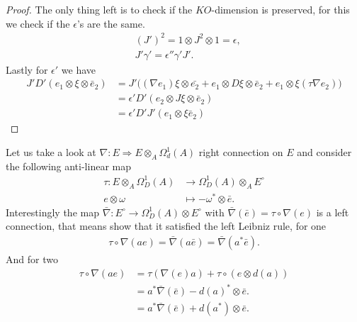 \begin{proof}
    The only thing left is to check if the $KO$-dimension is preserved,
    for this we check if the $\epsilon$'s are the same.
    \begin{align}
        &(J')^2 = 1 \otimes J^2 \otimes 1 = \epsilon,\\
        &J' \gamma '= \epsilon ''\gamma'J'.
    \end{align}
    Lastly for $\epsilon '$ we have
    \begin{align}
        J'D'(e_1 \otimes \xi \otimes \bar{e}_2)&=J'\big((\nabla e_1) \xi \otimes
        \bar{e_2} + e_1 \otimes D\xi \otimes \bar{e}_2 + e_1 \otimes \xi (\tau
        \nabla e_2)\big)\nonumber \\
        &= \epsilon' D'\left(e_2 \otimes J\xi \otimes \bar{e}_2\right)\nonumber\\
        &= \epsilon' D'J'\left(e_1 \otimes \xi \bar{e}_2\right)
    \end{align}
\end{proof}

Let us take a look at $\nabla : E \Rightarrow E \otimes _A \Omega _d^1 (A)$ right connection on $E$
and consider the following anti-linear map
\begin{align}
    \tau : E \otimes_A \Omega _D^1 (A) &\rightarrow \Omega _D^1 (A) \otimes_A E^\circ\\
            e \otimes \omega &\mapsto -\omega ^* \otimes \bar{e}.
\end{align}
Interestingly the map $\bar{\nabla} : E^\circ \rightarrow \Omega _D^1(A) \otimes E^\circ$
with $\bar{\nabla}(\bar{e}) = \tau \circ \nabla(e)$ is a left connection, that means
show that it satisfied the left Leibniz rule, for one
\begin{align}
    \tau \circ \nabla(ae) = \bar{\nabla}(a\bar{e}) = \bar{\nabla}(a^*
    \bar{e}).
\end{align}
And for two
\begin{align}
    \tau \circ \nabla(ae) &= \tau(\nabla(e)a) + \tau \circ(e \otimes
     d(a))\nonumber \\
     &=a^*\bar{\nabla}(\bar{e}) - d(a)^* \otimes \bar{e}. \nonumber\\
     &= a^*\bar{\nabla}(\bar{e}) + d(a^*) \otimes \bar{e}.
\end{align}


